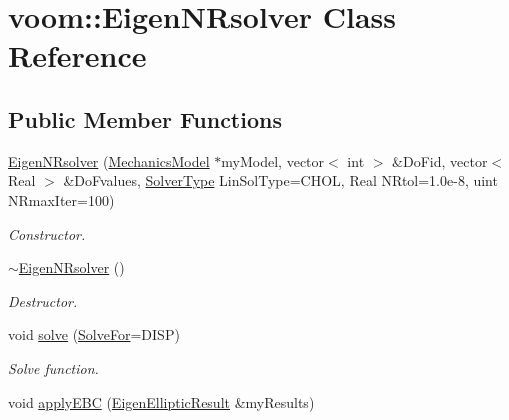\hypertarget{classvoom_1_1_eigen_n_rsolver}{
\section{voom::EigenNRsolver Class Reference}
\label{classvoom_1_1_eigen_n_rsolver}
}
\subsection*{Public Member Functions}
\begin{DoxyCompactItemize}
\item 
\hypertarget{classvoom_1_1_eigen_n_rsolver_a1c19f438f7c2351e342b6f216db9ef24}{
\hyperlink{classvoom_1_1_eigen_n_rsolver_a1c19f438f7c2351e342b6f216db9ef24}{EigenNRsolver} (\hyperlink{classvoom_1_1_mechanics_model}{MechanicsModel} $\ast$myModel, vector$<$ int $>$ \&DoFid, vector$<$ Real $>$ \&DoFvalues, \hyperlink{namespacevoom_a2874640a1124292b983171d745088fef}{SolverType} LinSolType=CHOL, Real NRtol=1.0e-\/8, uint NRmaxIter=100)}
\label{classvoom_1_1_eigen_n_rsolver_a1c19f438f7c2351e342b6f216db9ef24}

\begin{DoxyCompactList}\small\item\em Constructor. \item\end{DoxyCompactList}\item 
\hypertarget{classvoom_1_1_eigen_n_rsolver_a50c0e335aa475eb3ef9abcbe2d3ae477}{
\hyperlink{classvoom_1_1_eigen_n_rsolver_a50c0e335aa475eb3ef9abcbe2d3ae477}{$\sim$EigenNRsolver} ()}
\label{classvoom_1_1_eigen_n_rsolver_a50c0e335aa475eb3ef9abcbe2d3ae477}

\begin{DoxyCompactList}\small\item\em Destructor. \item\end{DoxyCompactList}\item 
\hypertarget{classvoom_1_1_eigen_n_rsolver_a77322c0870ebd3cb945f470eeef6e109}{
void \hyperlink{classvoom_1_1_eigen_n_rsolver_a77322c0870ebd3cb945f470eeef6e109}{solve} (\hyperlink{namespacevoom_a6dc64c378b8a785d6a835fe4d27b5588}{SolveFor}=DISP)}
\label{classvoom_1_1_eigen_n_rsolver_a77322c0870ebd3cb945f470eeef6e109}

\begin{DoxyCompactList}\small\item\em Solve function. \item\end{DoxyCompactList}\item 
\hypertarget{classvoom_1_1_eigen_n_rsolver_a8da8a2e5423080119c323b9a389de6c9}{
void \hyperlink{classvoom_1_1_eigen_n_rsolver_a8da8a2e5423080119c323b9a389de6c9}{applyEBC} (\hyperlink{structvoom_1_1_eigen_elliptic_result}{EigenEllipticResult} \&myResults)}
\label{classvoom_1_1_eigen_n_rsolver_a8da8a2e5423080119c323b9a389de6c9}


\end{DoxyCompactItemize}
